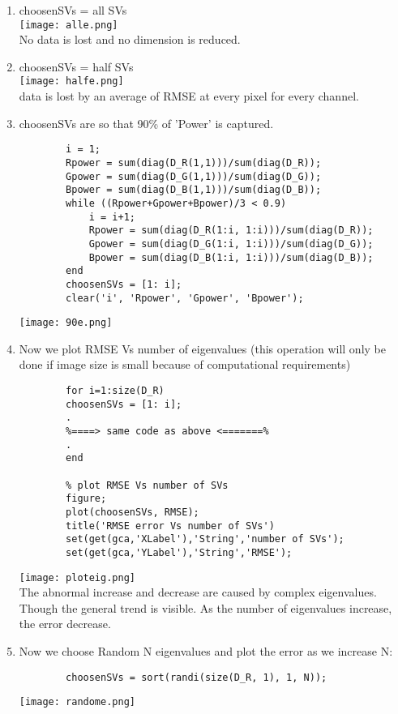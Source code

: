 \documentclass{article}
\begin{document}
  \begin{enumerate}
      \item choosenSVs = all SVs\\
      \texttt{[image: alle.png]}\\
      No data is lost and no dimension is reduced.
      \newpage
      \item choosenSVs = half SVs\\
      \texttt{[image: halfe.png]}\\
      data is lost by an average of RMSE at every pixel for every channel.
      \item choosenSVs are so that 90\% of 'Power' is captured.\\
      \begin{lstlisting}
        i = 1;
        Rpower = sum(diag(D_R(1,1)))/sum(diag(D_R));
        Gpower = sum(diag(D_G(1,1)))/sum(diag(D_G));
        Bpower = sum(diag(D_B(1,1)))/sum(diag(D_B));
        while ((Rpower+Gpower+Bpower)/3 < 0.9)
            i = i+1;
            Rpower = sum(diag(D_R(1:i, 1:i)))/sum(diag(D_R));
            Gpower = sum(diag(D_G(1:i, 1:i)))/sum(diag(D_G));
            Bpower = sum(diag(D_B(1:i, 1:i)))/sum(diag(D_B));
        end
        choosenSVs = [1: i];
        clear('i', 'Rpower', 'Gpower', 'Bpower');
      \end{lstlisting}
      \texttt{[image: 90e.png]}\\
      \newpage
      \item Now we plot RMSE Vs number of eigenvalues (this operation will only be done if image size is small because of computational requirements)
      \begin{lstlisting}
        for i=1:size(D_R)
        choosenSVs = [1: i];
        .
        %====> same code as above <=======%
        .
        end

        % plot RMSE Vs number of SVs
        figure;
        plot(choosenSVs, RMSE);
        title('RMSE error Vs number of SVs')
        set(get(gca,'XLabel'),'String','number of SVs');
        set(get(gca,'YLabel'),'String','RMSE');
      \end{lstlisting}
      \texttt{[image: ploteig.png]}\\
      The abnormal increase and decrease are caused by complex eigenvalues. Though the general trend is visible.
      As the number of eigenvalues increase, the error decrease.
      \item Now we choose Random N eigenvalues and plot the error as we increase N:\\
      \begin{lstlisting}
        choosenSVs = sort(randi(size(D_R, 1), 1, N));
      \end{lstlisting}
      \texttt{[image: randome.png]}
    \end{enumerate}
\end{document}
